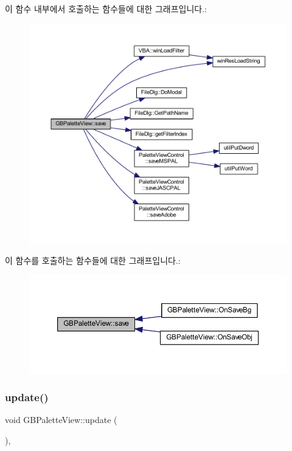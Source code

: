 이 함수 내부에서 호출하는 함수들에 대한 그래프입니다.\+:
\nopagebreak
\begin{figure}[H]
\begin{center}
\leavevmode
\includegraphics[width=350pt]{class_g_b_palette_view_a90cca0ba09442c669f7403d31e8ab0ee_cgraph}
\end{center}
\end{figure}
이 함수를 호출하는 함수들에 대한 그래프입니다.\+:
\nopagebreak
\begin{figure}[H]
\begin{center}
\leavevmode
\includegraphics[width=350pt]{class_g_b_palette_view_a90cca0ba09442c669f7403d31e8ab0ee_icgraph}
\end{center}
\end{figure}
\mbox{\label{class_g_b_palette_view_a43a43edd82e080e860aeb6a82ec106fc}} 
\subsubsection{\texorpdfstring{update()}{update()}}
{\footnotesize\ttfamily void G\+B\+Palette\+View\+::update (\begin{DoxyParamCaption}{ }\end{DoxyParamCaption})\hspace{0.3cm}{\ttfamily [protected]}, {\ttfamily [virtual]}}



